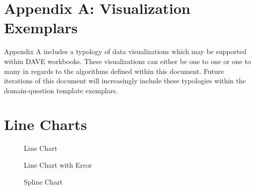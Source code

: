 \documentclass[../main.tex]{subfiles}
\begin{document}
\section*{Appendix A: Visualization Exemplars}

Appendix A includes a typology of data visualizations which may be supported within DAVE workbooks.
These visualizations can either be one to one or one to many in regards to the algorithms defined within this document.
Future iterations of this document will increasingly include these typologies within the domain-question template exemplars.

\section*{Line Charts}

\begin{figure*}[h]
  \centering
  {\caption{Line Chart}
    \label{fig1}}
  {}
\end{figure*}

\begin{figure*}[h]
  \centering
  {\caption {Line Chart with Error}
    \label{fig2}}
  {}
\end{figure*}

\begin{figure*}[h]
  \centering
  {\caption{Spline Chart}
    \label{fig3}}
  {}
\end{figure*}
\end{document}
